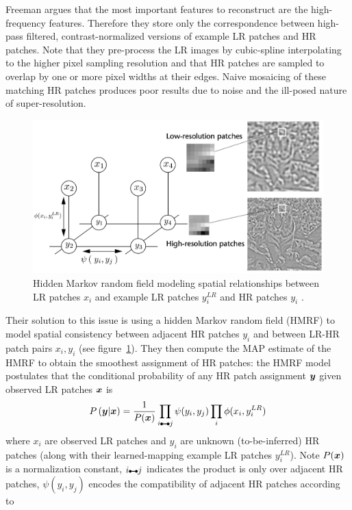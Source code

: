 Freeman \etal \cite{freeman2002example} argues that the most important features to reconstruct are the high-frequency features.
%
Therefore they store only the correspondence between high-pass filtered, contrast-normalized versions of example LR patches and HR patches.
%
Note that they pre-process the LR images by cubic-spline interpolating to the higher pixel sampling resolution and that HR patches are sampled to overlap by one or more pixel widths at their edges.
%
Naive mosaicing of these matching HR patches produces poor results due to noise and the ill-posed nature of super-resolution.
%
\begin{figure}[!htbp]
    \centering
    \includegraphics[width=\linewidth,keepaspectratio]{figures/classical/mrf.png}
    \caption{Hidden Markov random field modeling spatial relationships between LR patches \(x_i\) and example LR patches \(y_i^{LR}\) and HR patches \(y_i\) \cite{freeman2002example}.}
    \label{fig:mrf}
\end{figure}
Their solution to this issue is using a hidden Markov random field (HMRF) to model spatial consistency between adjacent HR patches \(y_i\) and between LR-HR patch pairs \(x_i, y_i\) (see figure~\ref{fig:mrf}).
%
They then compute the MAP estimate of the HMRF to obtain the smoothest assignment of HR patches: the HMRF model postulates that the conditional probability of any HR patch assignment \(\bm{y}\) given observed LR patches \(\bm{x}\) is
\begin{equation}
    P\left( \by \middle| \bx \right) = \frac{1}{P(\bx)} \prod_{i\ue{} j} \psi(y_i, y_j) \prod_i \phi(x_i, y_i^{LR})
\end{equation}
where \(x_i\) are observed LR patches and \(y_i\) are unknown (to-be-inferred) HR patches (along with their learned-mapping example LR patches \(y_i^{LR}\)).
%
Note \(P(\bm{x})\) is a normalization constant, \(i\ue{} j\) indicates the product is only over adjacent HR patches, \(\psi(y_i, y_j)\) encodes the compatibility of adjacent HR patches according to
